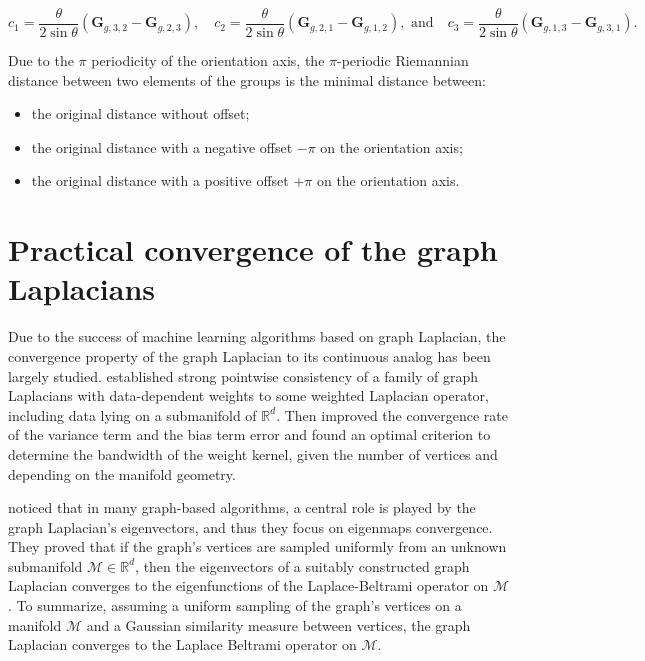 \documentclass{article}
\begin{document}
\begin{equation}
c_1 = \frac{\theta}{2 \sin \theta} ( \boldsymbol{G}_{g, 3, 2} - \boldsymbol{G}_{g, 2, 3})
, \quad
c_2 = \frac{\theta}{2 \sin \theta} ( \boldsymbol{G}_{g, 2, 1} - \boldsymbol{G}_{g, 1, 2})
, \text{ and} \quad
c_3 = \frac{\theta}{2 \sin \theta} ( \boldsymbol{G}_{g, 1, 3} - \boldsymbol{G}_{g, 3, 1}).
\end{equation}

Due to the $\pi$ periodicity of the orientation axis, the $\pi$-periodic Riemannian distance between two elements of the groups is the minimal distance between:
\begin{itemize}
\item the original distance without offset;
\item the original distance with a negative offset $-\pi$ on the orientation axis;
\item the original distance with a positive offset $+\pi$ on the orientation axis.
\end{itemize}

\clearpage
\section{Practical convergence of the graph Laplacians} \label{sec:practical_convergence}

Due to the success of machine learning algorithms based on graph Laplacian, the convergence property of the graph Laplacian to its continuous analog has been largely studied. \cite{hein2005graphs} established strong pointwise consistency of a family of graph Laplacians with data-dependent weights to some weighted Laplacian operator, including data lying on a submanifold of $\mathbb{R}^d$. Then \cite{singer2006graph} improved the convergence rate of the variance term and the bias term error and found an optimal criterion to determine the bandwidth of the weight kernel, given the number of vertices and depending on the manifold geometry. 

\cite{belkin2006convergence} noticed that in many graph-based algorithms, a central role is played by the graph Laplacian's eigenvectors, and thus they focus on eigenmaps convergence. They proved that if the graph's vertices are sampled uniformly from an unknown submanifold $\mathcal{M} \in \mathbb{R}^d$, then the eigenvectors of a suitably constructed graph Laplacian converges to the eigenfunctions of the Laplace-Beltrami operator on $\mathcal{M}$. To summarize, assuming a uniform sampling of the graph's vertices on a manifold $\mathcal{M}$ and a Gaussian similarity measure between vertices, the graph Laplacian converges to the Laplace Beltrami operator on $\mathcal{M}$.
\end{document}

